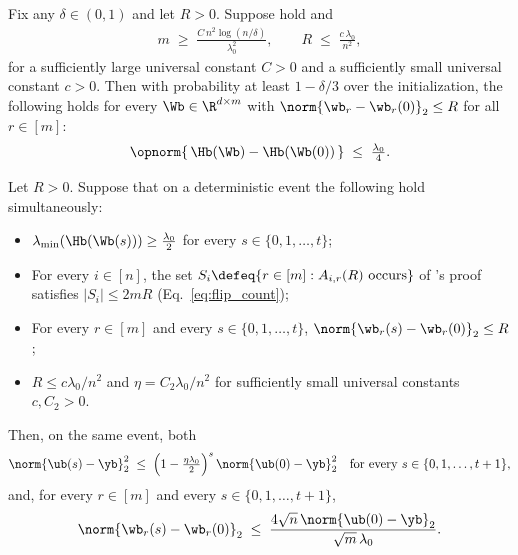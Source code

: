 \begin{lemma}\label{lem:perturbation}
Fix any $\delta \in (0, 1)$ and let $R > 0$. Suppose  hold and
\begin{align*}
m \;\ge\; \frac{C \, n^2 \log(n/\delta)}{\lambda_0^2},
\qquad
R \;\le\; \frac{c \, \lambda_0}{n^2},
\end{align*}
for a sufficiently large universal constant $C > 0$ and a sufficiently small universal constant $c > 0$. Then with probability at least $1 - \delta/3$ over the initialization, the following holds for every $\Wb \in \R^{d \times m}$ with $\norm{\wb_r - \wb_r(0)}_2 \le R$ for all $r \in [m]$:
\begin{align*}
\opnorm{\, \Hb(\Wb) - \Hb(\Wb(0)) \,} \;\le\; \tfrac{\lambda_0}{4}.
\end{align*}
\end{lemma}

\begin{lemma}\label{lem:linear_conv}
Let $R > 0$. Suppose that on a deterministic event the following hold simultaneously:
\begin{itemize}[leftmargin=2em, itemsep=0.2em]
\item $\lambda_{\min}(\Hb(\Wb(s))) \ge \tfrac{\lambda_0}{2}$ for every $s \in \{0, 1, \ldots, t\}$;
\item For every $i \in [n]$, the set $S_i \defeq \{r \in [m] : A_{i, r}(R) \text{ occurs}\}$ of 's proof satisfies $|S_i| \le 2 m R$ (Eq.~\eqref{eq:flip_count});
\item For every $r \in [m]$ and every $s \in \{0, 1, \ldots, t\}$, $\norm{\wb_r(s) - \wb_r(0)}_2 \le R$;
\item $R \le c \lambda_0 / n^2$ and $\eta = C_2 \lambda_0 / n^2$ for sufficiently small universal constants $c, C_2 > 0$.
\end{itemize}
Then, on the same event, both
\begin{align*}
\norm{\ub(s) - \yb}_2^2 \;\le\; \Big( 1 - \tfrac{\eta \lambda_0}{2} \Big)^s \, \norm{\ub(0) - \yb}_2^2
\quad \text{for every } s \in \{0, 1, \ldots, t+1\},
\end{align*}
and, for every $r \in [m]$ and every $s \in \{0, 1, \ldots, t+1\}$,
\begin{align*}
\norm{\wb_r(s) - \wb_r(0)}_2
\;\le\; \frac{4 \sqrt n \, \norm{\ub(0) - \yb}_2}{\sqrt m \, \lambda_0}.
\end{align*}
\end{lemma}

